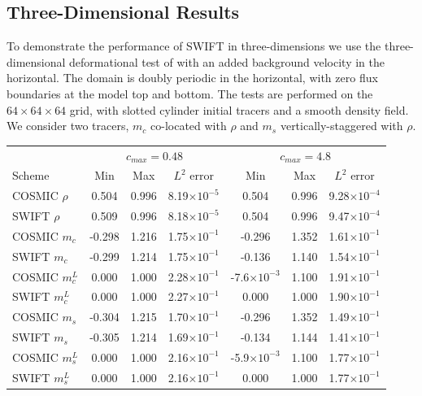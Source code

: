 \documentclass[11pt,a4paper]{article}
\begin{document}
\subsection{Three-Dimensional Results} \label{sec:resultd3d}
To demonstrate the performance of SWIFT in three-dimensions we use the three-dimensional deformational test of \cite{skamarock2006limiters} with an added background velocity in the horizontal. The domain is doubly periodic in the horizontal, with zero flux boundaries at the model top and bottom. The tests are performed on the $64\times64\times64$ grid, with slotted cylinder initial tracers and a smooth density field. We consider two tracers, $m_c$ co-located with $\rho$ and $m_s$ vertically-staggered with $\rho$.\\
\begin{table} [h!]
\small
\begin{center}
\begin{tabular}{| l | c c c | c c c |} \hline
  & \multicolumn{3}{c|}{$c_{max}=0.48$} & \multicolumn{3}{c|}{$c_{max}=4.8$} \\
Scheme & Min & Max & $L^2$ error & Min & Max & $L^2$ error \\ \hline
COSMIC $\rho$ & 0.504 & 0.996 & 8.19$\times 10^{-5}$ & 0.504 &  0.996 & 9.28$\times 10^{-4}$ \\ 
SWIFT $\rho$ & 0.509 & 0.996 & 8.18$\times 10^{-5}$ & 0.504 & 0.996 & 9.47$\times 10^{-4}$ \\
COSMIC $m_c$ & -0.298 & 1.216 & 1.75$\times 10^{-1}$ & -0.296 & 1.352 & 1.61$\times 10^{-1}$ \\ 
SWIFT $m_c$ & -0.299 & 1.214 & 1.75$\times 10^{-1}$ & -0.136 & 1.140 & 1.54$\times 10^{-1}$ \\ 
COSMIC $m^L_c$ & 0.000 & 1.000 & 2.28$\times 10^{-1}$ & -7.6$\times 10^{-3}$ & 1.100 & 1.91$\times 10^{-1}$  \\ 
SWIFT $m^L_c$ & 0.000 & 1.000 & 2.27$\times 10^{-1}$ & 0.000 & 1.000 & 1.90$\times 10^{-1}$ \\  
COSMIC $m_s$ & -0.304 & 1.215 & 1.70$\times 10^{-1}$ & -0.296 & 1.352 & 1.49$\times 10^{-1}$ \\ 
SWIFT $m_s$ & -0.305 & 1.214 & 1.69$\times 10^{-1}$ & -0.134 & 1.144 & 1.41$\times 10^{-1}$ \\ 
COSMIC $m^L_s$ & 0.000 & 1.000 & 2.16$\times 10^{-1}$ & -5.9$\times 10^{-3}$ &  1.100 & 1.77$\times 10^{-1}$ \\ 
SWIFT $m^L_s$ &  0.000 & 1.000 & 2.16$\times 10^{-1}$ & 0.000 &  1.000 & 1.77$\times 10^{-1}$ \\ 

\end{tabular}
\end{center}
\end{table}
\end{document}
